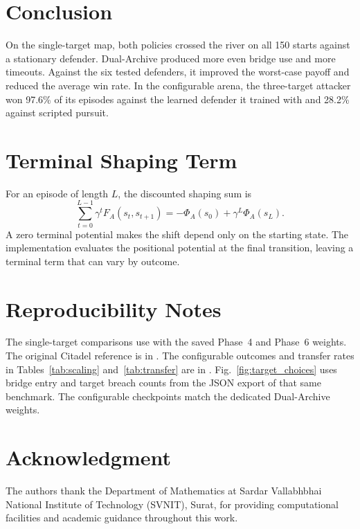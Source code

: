 \documentclass[conference,a4paper]{IEEEtran}
\begin{document}
\section{Conclusion}
On the single-target map, both policies crossed the river on all 150 starts against a stationary defender. Dual-Archive produced more even bridge use and more timeouts. Against the six tested defenders, it improved the worst-case payoff and reduced the average win rate. In the configurable arena, the three-target attacker won 97.6\% of its episodes against the learned defender it trained with and 28.2\% against scripted pursuit.

\newpage
\appendices
\section{Terminal Shaping Term}
\label{app:shaping}
For an episode of length $L$, the discounted shaping sum is
\begin{equation}
\sum_{t=0}^{L-1}\gamma^t F_A(s_t,s_{t+1})
=-\Phi_A(s_0)+\gamma^L\Phi_A(s_L).
\end{equation}
A zero terminal potential makes the shift depend only on the starting state. The implementation evaluates the positional potential at the final transition, leaving a terminal term that can vary by outcome.

\section{Reproducibility Notes}
The single-target comparisons use  with the saved Phase~4 and Phase~6 weights. The original Citadel reference is in . The configurable outcomes and transfer rates in Tables~\ref{tab:scaling} and~\ref{tab:transfer} are in . Fig.~\ref{fig:target_choices} uses bridge entry and target breach counts from the JSON export of that same benchmark. The configurable checkpoints match the dedicated Dual-Archive weights.

\section*{Acknowledgment}
The authors thank the Department of Mathematics at Sardar Vallabhbhai National Institute of Technology (SVNIT), Surat, for providing computational facilities and academic guidance throughout this work.
\end{document}

